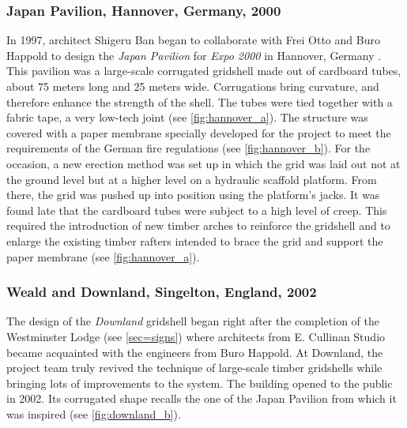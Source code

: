 \subsubsection{Japan Pavilion, Hannover, Germany, 2000}
In 1997, architect Shigeru Ban began to collaborate with Frei Otto and Buro Happold to design the \emph{Japan Pavilion} for \emph{Expo 2000} in Hannover, Germany \cite{Ban2006}. This pavilion was a large-scale corrugated gridshell made out of cardboard tubes, about 75 meters long and 25 meters wide. Corrugations bring curvature, and therefore enhance the strength of the shell. The tubes were tied together with a fabric tape, a very low-tech joint (see \cref{fig:hannover_a}). The structure was covered with a paper membrane specially developed for the project to meet the requirements of the German fire regulations (see \cref{fig:hannover_b}). For the occasion, a new erection method was set up in which the grid was laid out not at the ground level but at a higher level on a hydraulic scaffold platform. From there, the grid was pushed up into position using the platform's jacks. It was found late that the cardboard tubes were subject to a high level of creep. This required the introduction of new timber arches to reinforce the gridshell and to enlarge the existing timber rafters intended to brace the grid and support the paper membrane (see \cref{fig:hannover_a}).

\subsubsection{Weald and Downland, Singelton, England, 2002}
The design of the \emph{Downland} gridshell began right after the completion of the Westminster Lodge (see \cref{sec=signs}) where architects from E. Cullinan Studio became acquainted with the engineers from Buro Happold. At Downland, the project team truly revived the technique of large-scale timber gridshells while bringing lots of improvements to the system. The building opened to the public in 2002. Its corrugated shape recalls the one of the Japan Pavilion from which it was inspired (see \cref{fig:downland_b}).

